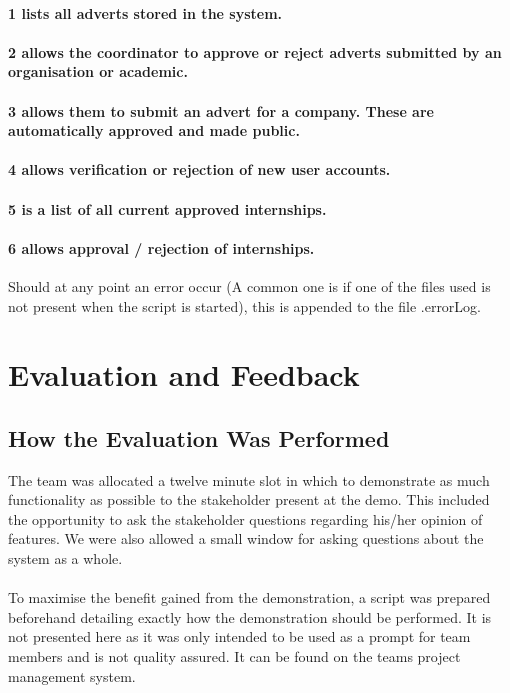 \documentclass{l3deliverable}
\begin{document}
\paragraph{\textmd{1 lists all adverts stored in the system.}}


\paragraph{\textmd{2 allows the coordinator to approve or reject adverts submitted
by an organisation or academic.}}


\paragraph{\textmd{3 allows them to submit an advert for a company. These are
automatically approved and made public.}}


\paragraph{\textmd{4 allows verification or rejection of new user accounts.}}


\paragraph{\textmd{5 is a list of all current approved internships.}}


\paragraph{\textmd{6 allows approval / rejection of internships.}}

Should at any point an error occur (A common one is if one of the
files used is not present when the script is started), this is appended
to the file .errorLog.


\section{Evaluation and Feedback}
\subsection{How the Evaluation Was Performed}
The team was allocated a twelve minute slot in which to demonstrate as much functionality as possible to the stakeholder present at the demo.
This included the opportunity to ask the stakeholder questions regarding his/her opinion of features. We were also allowed a small window for asking
questions about the system as a whole.\\
\\
To maximise the benefit gained from the demonstration, a script was prepared beforehand detailing exactly
how the demonstration should be performed. It is not presented here as it was only intended to be used as a prompt for 
team members and is not quality assured. It can be found on the teams project management system.\\
\end{document}
